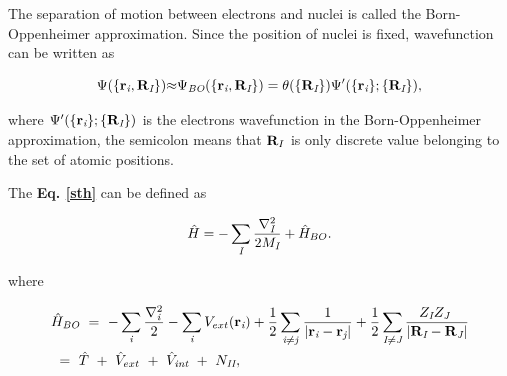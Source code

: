 \documentclass[a4paper, 12pt, titlepage,oneside,drop]{kthesis}
\begin{document}

The separation of motion between electrons and nuclei is called the Born-Oppenheimer approximation. Since the position of nuclei is fixed, wavefunction can be written as

\begin{equation}\label{nwf}
{\Psi(\{ {\textbf r}_{\textit i}, {\textbf R}_{\textit I} \})}  {\approx}  {\Psi_{ \textit{BO}} ( \{ {\textbf{r}_{\textit{i}}},\textbf{R}_{\textit I} \}) } = {\theta(\{{\textbf R}_{\textit I}\})} {\Psi'(\{\textbf{r}_{\textit i}\}; \{{\textbf R}_{\textit I}\})},
\end{equation}

where ${\Psi'(\{\textbf{r}_{\textit i}\}; \{{\textbf R}_{\textit I}\})}$  is the electrons wavefunction in the Born-Oppenheimer approximation, the semicolon means that $\textbf R_I$ is only discrete value belonging to the set of atomic positions. 
 
The \textbf{Eq. \ref{sth}} can be defined as

\begin{equation}\label{nh}
 {\hath} = - \sumi<I> \frac{{{\nabla}_{\textit{I}}^{2}}}{2 M_\textit{I}} + {\hath}_{BO}.
\end{equation}

where 

\begin{equation}\label{both}\begin{split}
&{\hath}_\textit{BO}\ =\ - \sumi<i>   \frac{{{\nabla}_{\textit{i}}^{2}}}{2}  - \sumi<i> V_{ext}(\textbf{r}_{\textit{i}})  + \frac{1}{2} \suminj<i><j> \frac{1}{ |\textbf{r}_\textit{i}-\textbf{r}_\textit{j}|} + \frac{1}{2} \suminj<I><J> \frac{Z_\textit{I} Z_\textit{J}\ }{|\textbf{R}_\textit{I}-\textbf{R}_\textit{J}|} \\
&\ = \ \hat{T} \ + \ \hat{V}_{ext} \ + \ \hat{V}_\textit{int}\ + \ N_\textit{II},
\end{split}\end{equation}
\end{document}
